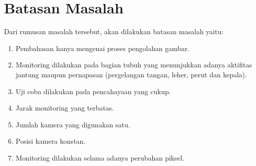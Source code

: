 \section{Batasan Masalah}  %

Dari rumusan masalah tersebut, akan dilakukan batasan masalah yaitu:
\begin{enumerate}
 \item Pembahasan hanya mengenai proses pengolahan gambar.
 \item Monitoring dilakukan pada bagian tubuh yang menunjukkan adanya aktifitas jantung maupun pernapasan (pergelangan tangan, leher, perut dan kepala).
 \item Uji coba dilakukan pada pencahayaan yang cukup.
 \item Jarak monitoring yang terbatas.
\item Jumlah kamera yang digunakan satu.
\item Posisi kamera konstan.
\item Monitoring dilakukan selama adanya perubahan piksel.
 
\end{enumerate}

